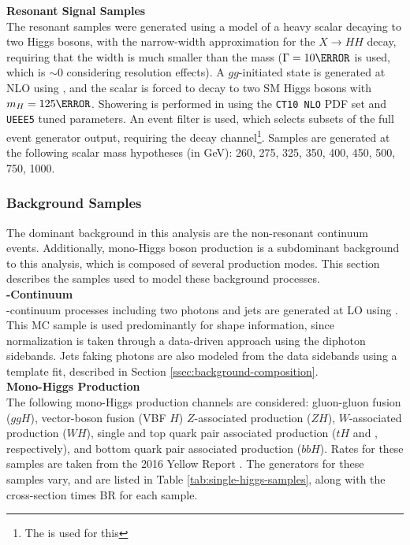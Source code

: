 \noindent\textbf{Resonant Signal Samples}\\
\indent The resonant samples were generated using a model of a heavy scalar decaying to two Higgs bosons, with the narrow-width approximation for the $X\rightarrow HH$ decay, requiring that the width is much smaller than the mass ($\Gamma = \unit{10}{\MeV}$ is used, which is $\sim$0 considering resolution effects). A $gg$-initiated state is generated at NLO using \AMCatNLO, and the scalar is forced to decay to two \gls{SM} Higgs bosons with $m_H = \unit{125}{\GeV}$. Showering is performed in \HERWIGpp using the \texttt{CT10 NLO} \gls{PDF} set and \texttt{UEEE5} tuned parameters. An event filter is used, which selects subsets of the full event generator output, requiring the \yybb decay channel\footnote{The  is used for this}. Samples are generated at the following scalar mass hypotheses (in GeV): 260, 275, 325, 350, 400, 450, 500, 750, 1000.


\subsubsection{Background Samples}\label{sssec:background-samples}
%
The dominant background in this analysis are the non-resonant \myy continuum events. Additionally, mono-Higgs boson production is a subdominant background to this analysis, which is composed of several production modes. This section describes the samples used to model these background processes.\\
%
\noindent\textbf{\yy-Continuum}\\
\indent \yy-continuum processes including two photons and jets are generated at \gls{LO} using \SHERPA. This \gls{MC} sample is used predominantly for shape information, since normalization is taken through a data-driven approach using the diphoton sidebands. Jets faking photons are also modeled from the data sidebands using a template fit, described in Section \ref{ssec:background-composition}.\\

\noindent\textbf{Mono-Higgs Production}\\
\indent The following mono-Higgs production channels are considered: gluon-gluon fusion ($ggH$), vector-boson fusion (VBF $H$) $Z$-associated production ($ZH$), $W$-associated production ($WH$), single and top quark pair associated production ($tH$ and \tth, respectively), and bottom quark pair associated production ($bbH$). Rates for these samples are taken from the 2016 Yellow Report \cite{yellow-report}. The generators for these samples vary, and are listed in Table \ref{tab:single-higgs-samples}, along with the cross-section times \gls{BR} for each sample.

